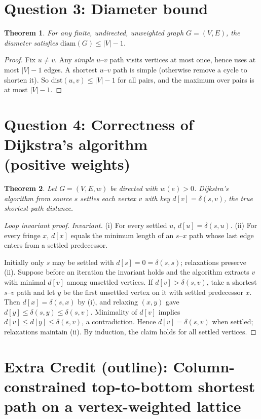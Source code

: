 \documentclass[11pt]{article}
\newtheorem{theorem}{Theorem}
\theoremstyle{definition}
\theoremstyle{remark}
\newcommand{\dist}{\mathrm{dist}}
\begin{document}
\section*{Question 3: Diameter bound}
\begin{theorem}
For any finite, undirected, unweighted graph $G=(V,E)$, the diameter satisfies $\mathrm{diam}(G)\le |V|-1$.
\end{theorem}

\begin{proof}
Fix $u\neq v$. Any \emph{simple} $u$–$v$ path visits vertices at most once, hence uses at most $|V|-1$ edges. A shortest $u$–$v$ path is simple (otherwise remove a cycle to shorten it). So $\dist(u,v)\le |V|-1$ for all pairs, and the maximum over pairs is at most $|V|-1$.
\end{proof}

\section*{Question 4: Correctness of Dijkstra's algorithm\\(positive weights)}
\begin{theorem}
Let $G=(V,E,w)$ be directed with $w(e)>0$. Dijkstra’s algorithm from source $s$ settles each vertex $v$ with key $d[v]=\delta(s,v)$, the true shortest-path distance.
\end{theorem}

\begin{proof}[Loop invariant proof]
\emph{Invariant.} (i) For every settled $u$, $d[u]=\delta(s,u)$. (ii) For every fringe $x$, $d[x]$ equals the minimum length of an $s$–$x$ path whose last edge enters from a settled predecessor.

Initially only $s$ may be settled with $d[s]=0=\delta(s,s)$; relaxations preserve (ii). Suppose before an iteration the invariant holds and the algorithm extracts $v$ with minimal $d[v]$ among unsettled vertices. If $d[v]>\delta(s,v)$, take a shortest $s$–$v$ path and let $y$ be the first unsettled vertex on it with settled predecessor $x$. Then $d[x]=\delta(s,x)$ by (i), and relaxing $(x,y)$ gave $d[y]\le \delta(s,y)\le \delta(s,v)$. Minimality of $d[v]$ implies $d[v]\le d[y]\le \delta(s,v)$, a contradiction. Hence $d[v]=\delta(s,v)$ when settled; relaxations maintain (ii). By induction, the claim holds for all settled vertices.
\end{proof}

\bigskip
\section*{Extra Credit (outline): Column-constrained top-to-bottom shortest path on a vertex-weighted lattice}
\end{document}
